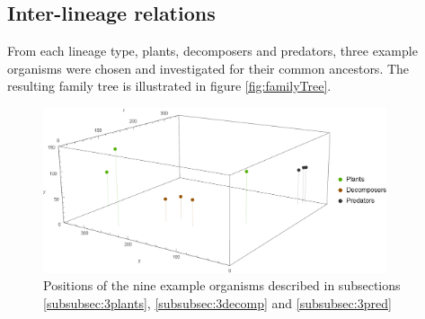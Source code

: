\subsection{Inter-lineage relations}
From each lineage type, plants, decomposers and predators, three example organisms were chosen and investigated for their common ancestors. The resulting family tree is illustrated in figure \ref{fig:familyTree}.

\begin{figure}
  \begin{center}
  \includegraphics[width=0.9\textwidth]{figure/lineOrgPos}
  \caption{Positions of the nine example organisms described in subsections \ref{subsubsec:3plants}, \ref{subsubsec:3decomp} and \ref{subsubsec:3pred}}
  \label{fig:lineOrgPos}
  \end{center}
\end{figure}

